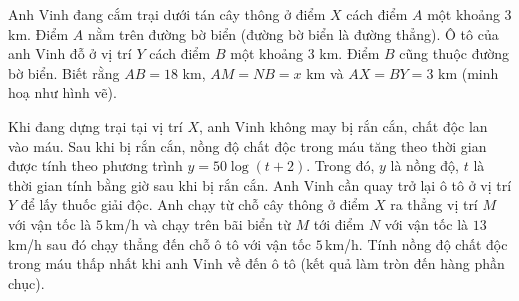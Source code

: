 \begin{ex}%
Anh Vinh đang cắm trại dưới tán cây thông ở điểm $X$ cách điểm $A$ một khoảng $3$ km. Điểm $A$ nằm trên đường bờ biển (đường bờ biển là đường thẳng). Ô tô của anh Vinh đỗ ở vị trí $Y$ cách điểm $B$ một khoảng $3$ km. Điểm $B$ cũng thuộc đường bờ biển. Biết rằng $AB=18$ km, $AM=NB=x$ km và $AX=BY=3$ km (minh hoạ như hình vẽ).
\begin{center}
\end{center}
Khi đang dựng trại tại vị trí $X$, anh Vinh không may bị rắn cắn, chất độc lan vào máu. Sau khi bị rắn cắn, nồng độ chất độc trong máu tăng theo thời gian được tính theo phương trình $y=50\log(t+2)$. Trong đó, $y$ là nồng độ, $t$ là thời gian tính bằng giờ sau khi bị rắn cắn. Anh Vinh cần quay trở lại ô tô ở vị trí $Y$ để lấy thuốc giải độc. Anh chạy từ chỗ cây thông ở điểm $X$ ra thẳng vị trí $M$  với vận tốc là $5$\,km/h và chạy trên bãi biển từ $M$ tới điểm $N$ với vận tốc là $13$\,km/h sau đó chạy thẳng đến chỗ ô tô với vận tốc $5$\,km/h. Tính nồng độ chất độc trong máu thấp nhất khi anh Vinh về đến ô tô (kết quả làm tròn đến hàng phần chục).
\end{ex}
